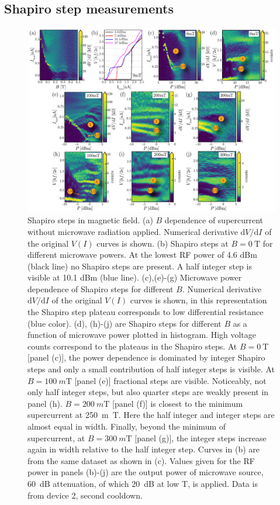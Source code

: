 \subsection{Shapiro step measurements}

\begin{figure}
\begin{center}
\includegraphics[width=\columnwidth]{chapter_supercurrent/figures/sup_fig2}
\caption{
Shapiro steps in magnetic field.
(a) $B$ dependence of supercurrent without microwave radiation applied.
Numerical derivative $\mathrm{d}V/\mathrm{d}{I}$ of the original $V\left(I\right)$ curves is shown.
(b) Shapiro steps at $B = \SI{0}{\tesla}$ for different microwave powers.
At the lowest RF power of 4.6 dBm (black line) no Shapiro steps are present.
A half integer step is visible at 10.1 dBm (blue line).
(c),(e)-(g) Microwave power dependence of Shapiro steps for different $B$.
Numerical derivative $\mathrm{d}V/\mathrm{d}{I}$ of the original $V\left(I\right)$ curves is shown, in this representation the Shapiro step plateau corresponds to low differential resistance (blue color).
(d), (h)-(j) are Shapiro steps for different $B$ as a function of microwave power plotted in histogram.
High voltage counts correspond to the plateaus in the Shapiro steps.
At $B = \SI{0}{\tesla}$ [panel (c)], the power dependence is dominated by integer Shapiro steps and only a small contribution of half integer steps is visible.
At $B = \SI{100}{m\tesla}$ [panel (e)]  fractional steps are visible.
Noticeably, not only half integer steps, but also quarter steps are weakly present in panel (h).
$B = \SI{200}{m\tesla}$ [panel (f)] is closest to the minimum supercurrent at \SI{250}{m\tesla}.
Here the half integer and integer steps are almost equal in width.
Finally, beyond the minimum of supercurrent, at $B = \SI{300}{m\tesla}$ [panel (g)], the integer steps increase again in width relative to the half integer step.
Curves in (b) are from the same dataset as shown in (c).
Values given for the RF power in panels (b)-(j) are the output power of microwave source, \SI{60}{\deci \bel} attenuation, of which \SI{20}{\deci \bel} at low T, is applied.
Data is from device 2, second cooldown.}
\label{fig:shapiro}
\end{center}
\end{figure}

